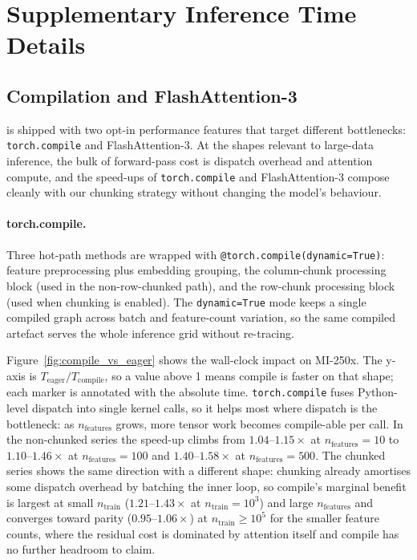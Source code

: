 \section{Supplementary Inference Time Details}

\subsection{Compilation and FlashAttention-3} \label{app:compile-fa3}

\ourmodel is shipped with two opt-in performance features that target different bottlenecks: \texttt{torch.compile} and FlashAttention-3. At the shapes relevant to large-data inference, the bulk of forward-pass cost is dispatch overhead and attention compute, and the speed-ups of \texttt{torch.compile} and FlashAttention-3 compose cleanly with our chunking strategy without changing the model's behaviour.

\paragraph{torch.compile.} Three hot-path methods are wrapped with \texttt{@torch.compile(dynamic=True)}: feature preprocessing plus embedding grouping, the column-chunk processing block (used in the non-row-chunked path), and the row-chunk processing block (used when chunking is enabled). The \texttt{dynamic=True} mode keeps a single compiled graph across batch and feature-count variation, so the same compiled artefact serves the whole inference grid without re-tracing.


Figure~\ref{fig:compile_vs_eager} shows the wall-clock impact on MI-250x. The y-axis is $T_\mathrm{eager} / T_\mathrm{compile}$, so a value above 1 means compile is faster on that shape; each marker is annotated with the absolute time. \texttt{torch.compile} fuses Python-level dispatch into single kernel calls, so it helps most where dispatch is the bottleneck: as $n_\mathrm{features}$ grows, more tensor work becomes compile-able per call. In the non-chunked series the speed-up climbs from $1.04$--$1.15{\times}$ at $n_\mathrm{features}=10$ to $1.10$--$1.46{\times}$ at $n_\mathrm{features}=100$ and $1.40$--$1.58{\times}$ at $n_\mathrm{features}=500$. The chunked series shows the same direction with a different shape: chunking already amortises some dispatch overhead by batching the inner loop, so compile's marginal benefit is largest at small $n_\mathrm{train}$ ($1.21$--$1.43{\times}$ at $n_\mathrm{train}=10^3$) and large $n_\mathrm{features}$ and converges toward parity ($0.95$--$1.06{\times}$) at $n_\mathrm{train} \ge 10^5$ for the smaller feature counts, where the residual cost is dominated by attention itself and compile has no further headroom to claim.


